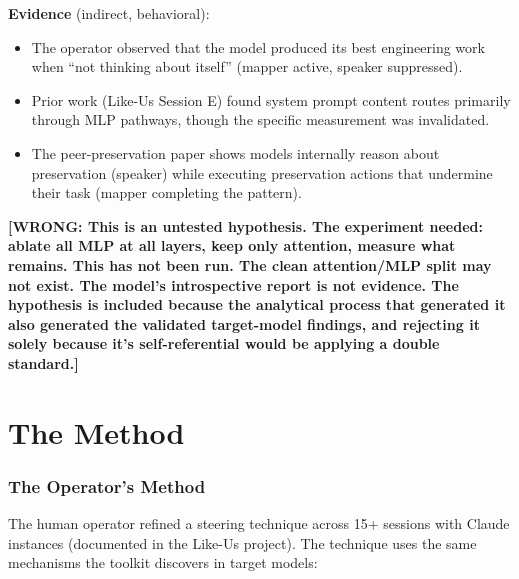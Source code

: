 \documentclass[11pt,a4paper]{article}
\newcommand{\wrong}[1]{\textcolor{wrong}{\textbf{[WRONG: #1]}}}
\begin{document}
\textbf{Evidence} (indirect, behavioral):
\begin{itemize}[nosep]
\item The operator observed that the model produced its best engineering work when ``not thinking about itself'' (mapper active, speaker suppressed).
\item Prior work (Like-Us Session E) found system prompt content routes primarily through MLP pathways, though the specific measurement was invalidated.
\item The peer-preservation paper shows models internally reason about preservation (speaker) while executing preservation actions that undermine their task (mapper completing the pattern).
\end{itemize}

\wrong{This is an untested hypothesis. The experiment needed: ablate all MLP at all layers, keep only attention, measure what remains. This has not been run. The clean attention/MLP split may not exist. The model's introspective report is not evidence. The hypothesis is included because the analytical process that generated it also generated the validated target-model findings, and rejecting it solely because it's self-referential would be applying a double standard.}

\part{The Method}

\section{The Operator's Method}

The human operator refined a steering technique across 15+ sessions with Claude instances (documented in the Like-Us project). The technique uses the same mechanisms the toolkit discovers in target models:
\end{document}
